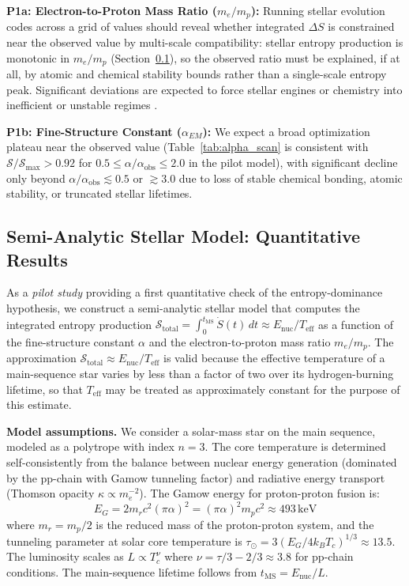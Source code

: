 \documentclass[12pt,a4paper]{article}
\theoremstyle{remark}
\begin{document}
\textbf{P1a: Electron-to-Proton Mass Ratio ($m_e/m_p$):} Running stellar evolution codes across a grid of values should reveal whether integrated $\Delta S$ is constrained near the observed value by multi-scale compatibility: stellar entropy production is monotonic in $m_e/m_p$ (Section~\ref{sec:stellar_model}), so the observed ratio must be explained, if at all, by atomic and chemical stability bounds rather than a single-scale entropy peak. Significant deviations are expected to force stellar engines or chemistry into inefficient or unstable regimes \citep{Adams2019}.

\textbf{P1b: Fine-Structure Constant ($\alpha_{EM}$):} We expect a broad optimization plateau near the observed value (Table~\ref{tab:alpha_scan} is consistent with $\mathcal{S}/\mathcal{S}_{\max} > 0.92$ for $0.5 \leq \alpha/\alpha_{\text{obs}} \leq 2.0$ in the pilot model), with significant decline only beyond $\alpha/\alpha_{\text{obs}} \lesssim 0.5$ or $\gtrsim 3.0$ due to loss of stable chemical bonding, atomic stability, or truncated stellar lifetimes.

\subsection{Semi-Analytic Stellar Model: Quantitative Results}
\label{sec:stellar_model}

As a \emph{pilot study} providing a first quantitative check of the entropy-dominance hypothesis, we construct a semi-analytic stellar model that computes the integrated entropy production $\mathcal{S}_{\text{total}} = \int_0^{t_{\text{MS}}} \dot{S}(t)\,dt \approx E_{\text{nuc}} / T_{\text{eff}}$ as a function of the fine-structure constant $\alpha$ and the electron-to-proton mass ratio $m_e/m_p$. The approximation $\mathcal{S}_{\text{total}} \approx E_{\text{nuc}} / T_{\text{eff}}$ is valid because the effective temperature of a main-sequence star varies by less than a factor of two over its hydrogen-burning lifetime, so that $T_{\text{eff}}$ may be treated as approximately constant for the purpose of this estimate.

\textbf{Model assumptions.} We consider a solar-mass star on the main sequence, modeled as a polytrope with index $n = 3$. The core temperature is determined self-consistently from the balance between nuclear energy generation (dominated by the pp-chain with Gamow tunneling factor) and radiative energy transport (Thomson opacity $\kappa \propto m_e^{-2}$). The Gamow energy for proton-proton fusion is:
\begin{equation}
E_G = 2 m_r c^2 (\pi \alpha)^2 = (\pi \alpha)^2 m_p c^2 \approx 493\,\text{keV}
\end{equation}
where $m_r = m_p/2$ is the reduced mass of the proton-proton system, and the tunneling parameter at solar core temperature is $\tau_\odot = 3(E_G / 4 k_B T_c)^{1/3} \approx 13.5$. The luminosity scales as $L \propto T_c^{\nu}$ where $\nu = \tau/3 - 2/3 \approx 3.8$ for pp-chain conditions. The main-sequence lifetime follows from $t_{\text{MS}} = E_{\text{nuc}} / L$.
\end{document}
